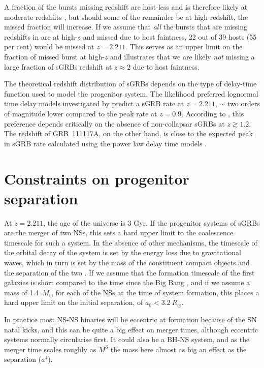 \documentclass{aa}    %
\begin{document}
A fraction of the bursts missing redshift are host-less and is therefore likely
at moderate redshifts \citep{Tunnicliffe2014}, but should some of the remainder
be at high redshift, the missed fraction will increase. If we assume that
\textit{all} the bursts that are missing redshifts in \citet{Berger2014} are at
high-$z$ and missed due to host faintness, 22 out of 39 hosts (55 per cent)
would be missed at $z = 2.211$. This serves as an upper limit on the fraction of
missed burst at high-$z$ and illustrates that we are likely \textit{not} missing a
large fraction of sGRBs redshift at $z \approx 2$ due to host faintness.

The theoretical redshift distribution of sGRBs depends on the type of delay-time
function used to model the progenitor system. The likelihood preferred lognormal
time delay models investigated by \citet{Wanderman2015} predict a sGRB rate at
$z = 2.211$, $\sim$ two orders of magnitude lower compared to the peak rate at
$z = 0.9$. According to \citet{Wanderman2015}, this preference depends
critically on the absence of non-collapsar sGRBs at $z \gtrsim 1.2$. The
redshift of GRB~111117A, on the other hand, is close to the expected peak in
sGRB rate calculated using the power law delay time models \citep{Behroozi2014,
	Wanderman2015}.


\section{Constraints on progenitor separation}

At $z = 2.211$, the age of the universe is 3 Gyr. If the progenitor systems of
sGRBs are the merger of two NSs, this sets a hard upper limit to the coalescence
timescale for such a system. In the absence of other mechanisms, the timescale
of the orbital decay of the system is set by the energy loss due to
gravitational waves, which in turn is set by the mass of the constituent compact
objects and the separation of the two \citep{Postnov2014}. If we assume that the
formation timescale of the first galaxies is short compared to the time since
the Big Bang \citep{Richard2011}, and if we assume a mass of 1.4~$M_\odot$ for
each of the NSs at the time of system formation, this places a hard upper limit
on the initial separation, of $a_0 < 3.2~R_\odot$.

In practice most NS-NS binaries will be eccentric at formation because of the SN
natal kicks, and this can be quite a big effect on merger times, although
eccentric systems normally circularise first. It could also be a BH-NS system,
and as the merger time scales roughly as $M^3$ the mass here almost as big an
effect as the separation ($a^4$).
\end{document}
